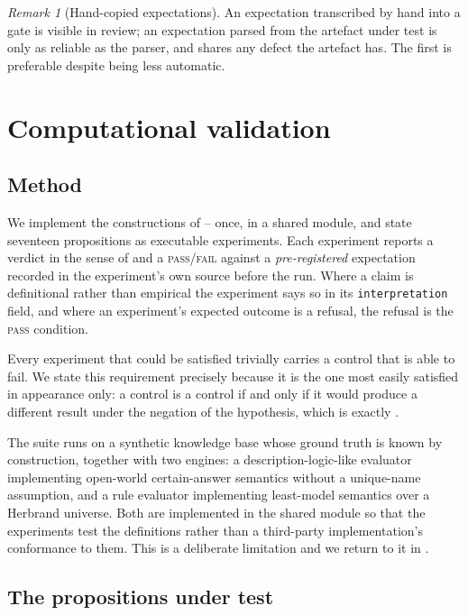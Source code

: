 \documentclass[11pt,a4paper]{article}
\theoremstyle{plain}
\theoremstyle{definition}
\theoremstyle{remark}
\newtheorem{remark}[theorem]{Remark}
\begin{document}
\begin{remark}[Hand-copied expectations]
\label{rem:hand-copied}
An expectation transcribed by hand into a gate is visible in review; an
expectation parsed from the artefact under test is only as reliable as the
parser, and shares any defect the artefact has. The first is preferable
despite being less automatic.
\end{remark}

\section{Computational validation}
\label{sec:validation}

\subsection{Method}

We implement the constructions of -- once,
in a shared module, and state seventeen propositions as executable
experiments. Each experiment reports a verdict in the sense of
 and a \textsc{pass}/\textsc{fail} against a
\emph{pre-registered} expectation recorded in the experiment's own source
before the run. Where a claim is definitional rather than empirical the
experiment says so in its \texttt{interpretation} field, and where an
experiment's expected outcome is a refusal, the refusal is the \textsc{pass}
condition.

Every experiment that could be satisfied trivially carries a control that is
able to fail. We state this requirement precisely because it is the one most
easily satisfied in appearance only: a control is a control if and only if it
would produce a different result under the negation of the hypothesis, which
is exactly .

The suite runs on a synthetic knowledge base whose ground truth is known by
construction, together with two engines: a description-logic-like evaluator
implementing open-world certain-answer semantics without a unique-name
assumption, and a rule evaluator implementing least-model semantics over a
Herbrand universe. Both are implemented in the shared module so that the
experiments test the definitions rather than a third-party implementation's
conformance to them. This is a deliberate limitation and we return to it in
.

\subsection{The propositions under test}
\end{document}
